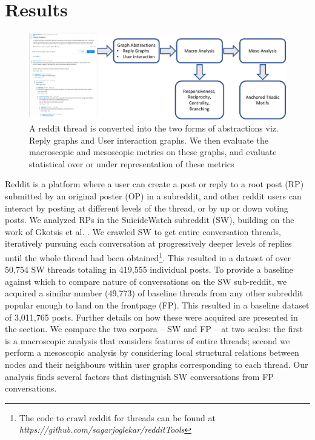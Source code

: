 \vspace{-5mm}
\section{Results}
\begin{figure}[!ht]
    \centering
    \includegraphics[width=0.7\linewidth]{Figures/Pipeline.pdf}
    \caption{A reddit thread is converted into the two forms of abstractions viz. Reply graphs and User interaction graphs. We then evaluate the macroscopic and mesoscopic metrics on these graphs, and evaluate statistical over or under representation of these metrics}
    \label{fig:pipeline}
\end{figure}

Reddit is a platform where a user can create a post or reply to a root post (RP) submitted by an original poster (OP) in a subreddit, and other reddit users can interact by posting at different levels of the thread, or by up or down voting posts. We analyzed RPs in the SuicideWatch subreddit (SW), building on the work of Gkotsis et al. \cite{gkotsis2017characterisation}.
We crawled SW to get entire conversation threads,
iteratively pursuing each conversation at progressively deeper levels of replies until the whole thread had been obtained\footnote{The code to crawl reddit for threads can be found at \textit{https://github.com/sagarjoglekar/redditTools}}. This resulted in a dataset of over 50,754 SW threads totaling in 419,555 individual posts. 
To provide a baseline against which to compare nature of conversations on the SW sub-reddit, we acquired a similar number (49,773) of baseline threads from any other subreddit popular enough to land on the frontpage (FP). This resulted in a baseline dataset of 3,011,765 posts. Further details on how these were acquired are presented in the  section. We compare the two corpora -- SW and FP -- at two scales: the first is a macroscopic analysis that considers features of entire threads; second we perform a mesoscopic analysis by considering local structural relations between nodes and their neighbours within user graphs corresponding to each thread. Our analysis finds several factors that distinguish SW conversations from FP conversations. %
